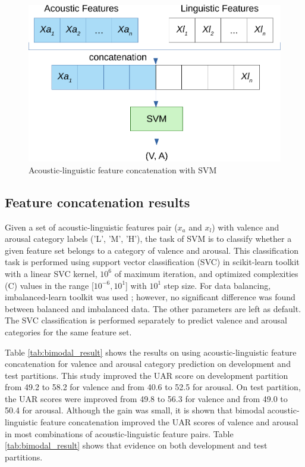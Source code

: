 \begin{figure}[t]
  \centering
  \includegraphics[width=0.7\linewidth]{../fig/feature_fusion.pdf}
  \caption{Acoustic-linguistic feature concatenation with SVM}
  \label{fig:feature_fusion}
\end{figure}

\subsection{Feature concatenation results}
Given a set of acoustic-linguistic features pair ($x_a$ and $x_l$) with valence
and arousal category labels ('L', 'M', 'H'), the task of SVM is to classify
whether a given feature set belongs to a category of valence and arousal. This
classification task is performed using support vector classification (SVC) in
scikit-learn toolkit \cite{scikit-learn} with a linear SVC kernel, $10^6$ of
maximum iteration, and optimized complexities (C) values in the range
[$10^{-6}, 10^1$] with $10^{1}$ step size. For data balancing, imbalanced-learn
toolkit was used \cite{Lemaitre2017}; however, no significant difference was
found between balanced and imbalanced data. The other parameters are left as
default. The SVC classification is performed separately to predict valence and
arousal categories for the same feature set.


Table \ref{tab:bimodal_result} shows the results on using acoustic-linguistic
feature concatenation for valence and arousal category prediction on
development and test partitions. This study improved the UAR score on
development partition from 49.2 to 58.2 for valence and from 40.6 to 52.5 for
arousal. On test partition, the UAR scores were improved from 49.8 to 56.3 for
valence and from 49.0 to 50.4 for arousal. Although the gain was small, it is
shown that bimodal acoustic-linguistic feature concatenation improved the UAR
scores of valence and arousal in most combinations of acoustic-linguistic
feature pairs. Table \ref{tab:bimodal_result} shows that evidence on both
development and test partitions.

